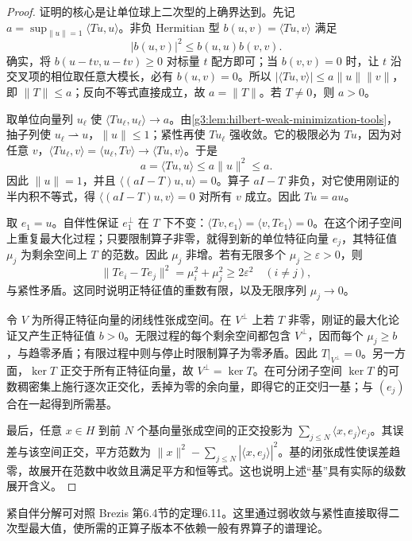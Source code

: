 \begin{proof}
	证明的核心是让单位球上二次型的上确界达到。先记
	\(a=\sup_{\|u\|=1}\langle Tu,u\rangle\)。非负 Hermitian 型 \(b(u,v)=\langle Tu,v\rangle\) 满足
	\[
		|b(u,v)|^2\le b(u,u)b(v,v).
	\]
	确实，将 \(b(u-tv,u-tv)\ge0\) 对标量 \(t\) 配方即可；当 \(b(v,v)=0\) 时，让 \(t\) 沿交叉项的相位取任意大模长，必有 \(b(u,v)=0\)。所以
	\(|\langle Tu,v\rangle|\le a\|u\|\|v\|\)，即 \(\|T\|\le a\)；反向不等式直接成立，故 \(a=\|T\|\)。若 \(T\ne0\)，则 \(a>0\)。

	取单位向量列 \(u_\ell\) 使 \(\langle Tu_\ell,u_\ell\rangle\to a\)。由\cref{g3:lem:hilbert-weak-minimization-tools}，抽子列使 \(u_\ell\rightharpoonup u\)，\(\|u\|\le1\)；紧性再使 \(Tu_\ell\) 强收敛。它的极限必为 \(Tu\)，因为对任意 \(v\)，\(\langle Tu_\ell,v\rangle=\langle u_\ell,Tv\rangle\to\langle Tu,v\rangle\)。于是
	\[
		a=\langle Tu,u\rangle\le a\|u\|^2\le a.
	\]
	因此 \(\|u\|=1\)，并且 \(\langle(aI-T)u,u\rangle=0\)。算子 \(aI-T\) 非负，对它使用刚证的半内积不等式，得 \(\langle(aI-T)u,v\rangle=0\) 对所有 \(v\) 成立。因此 \(Tu=au\)。

	取 \(e_1=u\)。自伴性保证 \(e_1^\perp\) 在 \(T\) 下不变：\(\langle Tv,e_1\rangle=\langle v,Te_1\rangle=0\)。在这个闭子空间上重复最大化过程；只要限制算子非零，就得到新的单位特征向量 \(e_j\)，其特征值 \(\mu_j\) 为剩余空间上 \(T\) 的范数。因此 \(\mu_j\) 非增。若有无限多个 \(\mu_j\ge\varepsilon>0\)，则
	\[
		\|Te_i-Te_j\|^2=\mu_i^2+\mu_j^2\ge2\varepsilon^2
		\quad(i\ne j),
	\]
	与紧性矛盾。这同时说明正特征值的重数有限，以及无限序列 \(\mu_j\to0\)。

	令 \(V\) 为所得正特征向量的闭线性张成空间。在 \(V^\perp\) 上若 \(T\) 非零，刚证的最大化论证又产生正特征值 \(b>0\)。无限过程的每个剩余空间都包含 \(V^\perp\)，因而每个 \(\mu_j\ge b\)，与趋零矛盾；有限过程中则与停止时限制算子为零矛盾。因此 \(T|_{V^\perp}=0\)。另一方面，\(\ker T\) 正交于所有正特征向量，故 \(V^\perp=\ker T\)。在可分闭子空间 \(\ker T\) 的可数稠密集上施行逐次正交化，丢掉为零的余向量，即得它的正交归一基；与 \((e_j)\) 合在一起得到所需基。

	最后，任意 \(x\in H\) 到前 \(N\) 个基向量张成空间的正交投影为 \(\sum_{j\le N}\langle x,e_j\rangle e_j\)。其误差与该空间正交，平方范数为 \(\|x\|^2-\sum_{j\le N}|\langle x,e_j\rangle|^2\)。基的闭张成性使误差趋零，故展开在范数中收敛且满足平方和恒等式。这也说明上述“基”具有实际的级数展开含义。
\end{proof}

紧自伴分解可对照 Brezis 第6.4节的定理6.11。\cite[第6.4节，定理6.11]{Brezis2011}这里通过弱收敛与紧性直接取得二次型最大值，使所需的正算子版本不依赖一般有界算子的谱理论。

